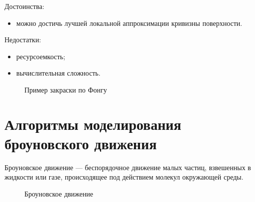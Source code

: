 Достоинства:
\begin{itemize}
	\item можно достичь лучшей локальной аппроксимации кривизны поверхности.
\end{itemize}

Недостатки:
\begin{itemize}
	\item ресурсоемкость;
	\item вычислительная сложность.
\end{itemize}


\begin{figure}[ph!]
	\caption{Пример закраски по Фонгу}
	\label{fig:draw_phong}
\end{figure}

\section{Алгоритмы моделирования броуновского движения}

Броуновское движение --- беспорядочное движение малых частиц, взвешенных в жидкости или газе, происходящее под действием молекул окружающей среды. 

\begin{figure}[ph!]
	\caption{Броуновское движение}
	\label{fig:brown_movement}
\end{figure}

